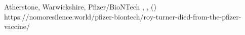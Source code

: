           {Atherstone, Warwickshire, }
          {}
          {Pfizer/BioNTech}
          {}
          {
            ,
            ,
             ()
          }
          {https://nomoresilence.world/pfizer-biontech/roy-turner-died-from-the-pfizer-vaccine/}

